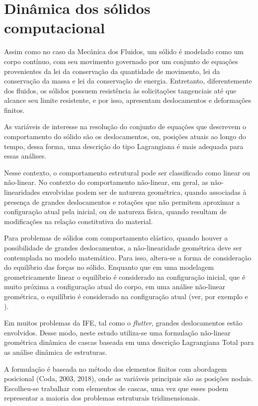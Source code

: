 \chapter[Dinâmica dos sólidos computacional]{Dinâmica dos sólidos computacional} \label{capitulo:Cap4}

Assim como no caso da Mecânica dos Fluidos, um sólido é modelado como um corpo contínuo, com seu movimento governado por um conjunto de equações provenientes da lei da conservação da quantidade de movimento, lei da conservação da massa e lei da conservação de energia. Entretanto, diferentemente dos fluidos, os sólidos possuem resistência às solicitações tangenciais até que alcance seu limite resistente, e por isso, apresentam deslocamentos e deformações finitos. 

As variáveis de interesse na resolução do conjunto de equações que descrevem o comportamento do sólido são os deslocamentos, ou, posições atuais ao longo do tempo, dessa forma, uma descrição do tipo Lagrangiana é mais adequada para essas análises.

Nesse contexto, o comportamento estrutural pode ser classificado como linear ou não-linear. No contexto do comportamento não-linear, em geral, as não-linearidades envolvidas podem ser de natureza geométrica, quando associadas à presença de grandes deslocamentos e rotações que não permitem aproximar a configuração atual pela inicial, ou de natureza física, quando resultam de modificações na relação constitutiva do material.

Para problemas de sólidos com comportamento elástico, quando houver a possibilidade de grandes deslocamentos, a não-linearidade geométrica deve ser contemplada no modelo matemático. Para isso, altera-se a forma de consideração do equilíbrio das forças no sólido. Enquanto que em uma modelagem geometricamente linear o equilíbrio é considerado na configuração inicial, que é muito próxima a configuração atual do corpo, em uma análise não-linear geométrica, o equilíbrio é considerado na configuração atual (ver, por exemplo   e ).

Em muitos problemas da IFE, tal como o \textit{flutter}, grandes deslocamentos estão envolvidos. Desse modo, neste estudo utiliza-se uma formulação não-linear geométrica dinâmica de cascas baseada em uma descrição Lagrangiana Total para as análise dinâmica de estruturas. 

A formulação é baseada no método dos elementos finitos com abordagem posicional (Coda, 2003, 2018), onde as variáveis principais são as posições nodais. Escolheu-se trabalhar com elementos de cascas, uma vez que esses podem representar a maioria dos problemas estruturais tridimensionais. 

